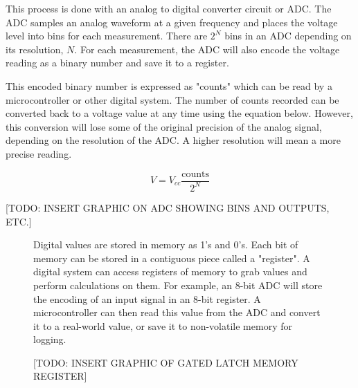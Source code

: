 This process is done with an analog to digital converter circuit or ADC. 
The ADC samples an analog waveform at a given frequency and places the voltage level into bins for each measurement.
There are $2^N$ bins in an ADC depending on its resolution, $N$.
For each measurement, the ADC will also encode the voltage reading as a binary number and save it to a register.

This encoded binary number is expressed as "counts" which can be read by a microcontroller or other digital system.
The number of counts recorded can be converted back to a voltage value at any time using the equation below.
However, this conversion will lose some of the original precision of the analog signal, depending on the resolution of the ADC.
A higher resolution will mean a more precise reading.

\begin{equation*}
    V = V_{cc} \frac{\text{counts}}{2^N}
\end{equation*}

[TODO: INSERT GRAPHIC ON ADC SHOWING BINS AND OUTPUTS, ETC.]

\begin{figure}
    \begin{fitbox}[frametitle=Aside: Registers]
        Digital values are stored in memory as 1's and 0's.
        Each bit of memory can be stored in a contiguous piece called a "register".
        A digital system can access registers of memory to grab values and perform calculations on them.
        For example, an 8-bit ADC will store the encoding of an input signal in an 8-bit register.
        A microcontroller can then read this value from the ADC and convert it to a real-world value, or save it to non-volatile memory for logging.

        [TODO: INSERT GRAPHIC OF GATED LATCH MEMORY REGISTER]
    \end{fitbox}
\end{figure}